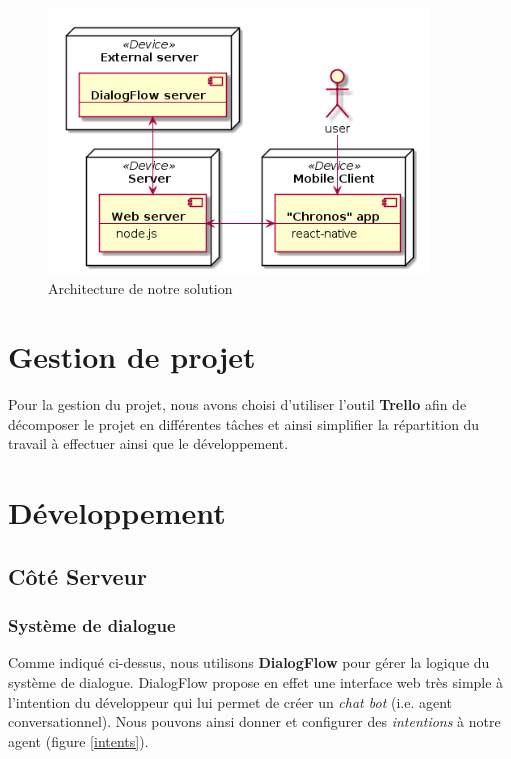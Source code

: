 \begin{figure}[H]
	\centering
		\centering
		\includegraphics[width=0.9\textwidth]{../docs/conception/build/architectureDiagram.png}
        \caption{Architecture de notre solution}
        \label{archi}
\end{figure}


\section{Gestion de projet}

Pour la gestion du projet, nous avons choisi d'utiliser l'outil \textbf{Trello}\cite{trello} afin de décomposer le projet en différentes tâches et ainsi simplifier 
la répartition du travail à effectuer ainsi que le développement. 

\section{Développement}

\subsection{Côté Serveur}

\subsubsection{Système de dialogue}

Comme indiqué ci-dessus, nous utilisons \textbf{DialogFlow} pour gérer la logique du système de dialogue. DialogFlow propose en effet une interface web très simple à 
l'intention du développeur qui lui permet de créer un \emph{chat bot} (i.e. agent conversationnel). Nous pouvons ainsi donner et configurer des \emph{intentions} à notre agent (figure \ref{intents}).\\

